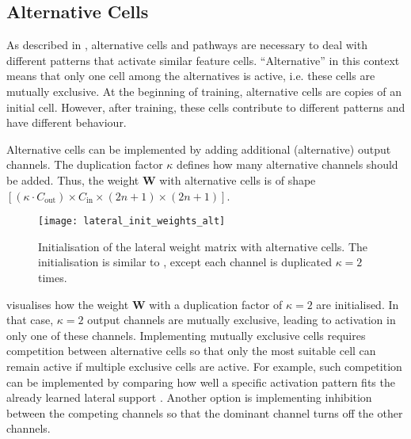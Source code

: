 \subsection{Alternative Cells}
As described in , alternative cells and pathways are necessary to deal with different patterns that activate similar feature cells.
``Alternative'' in this context means that only one cell among the alternatives is active, i.e. these cells are mutually exclusive.
At the beginning of training, alternative cells are copies of an initial cell.
However, after training, these cells contribute to different patterns and have different behaviour.

Alternative cells can be implemented by adding additional (alternative) output channels.
The duplication factor $\kappa$ defines how many alternative channels should be added.
Thus, the weight $\boldsymbol{W}$ with alternative cells is of shape $\left[(\kappa \cdot C_{\text{out}}) \times C_{\text{in}} \times (2n+1) \times (2n+1)\right]$.

\begin{figure}[h]
    \centering
    \texttt{[image: lateral\_init\_weights\_alt]}
    \caption[Initialisation of the lateral weight matrix with alternative cells]{Initialisation of the lateral weight matrix with alternative cells. The initialisation is similar to , except each channel is duplicated $\kappa=2$ times.}
\end{figure}

 visualises how the weight $\boldsymbol{W}$ with a duplication factor of $\kappa=2$ are initialised.
In that case, $\kappa=2$ output channels are mutually exclusive, leading to activation in only one of these channels.
Implementing mutually exclusive cells requires competition between alternative cells  so that only the most suitable cell can remain active if multiple exclusive cells are active.
For example, such competition can be implemented by comparing how well a specific activation pattern fits the already learned lateral support .
Another option is implementing inhibition between the competing channels so that the dominant channel turns off the other channels.


